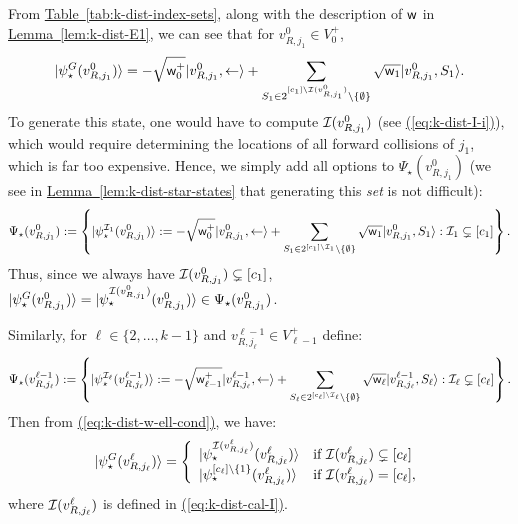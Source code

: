 \documentclass{theoretics}
\newcommand{\eq}[1]{\hyperref[eq:#1]{(\ref*{eq:#1})}}
\newcommand{\lem}[1]{\hyperref[lem:#1]{Lemma~\ref*{lem:#1}}}
\newcommand{\tabl}[1]{\hyperref[tab:#1]{Table~\ref*{tab:#1}}}
\def\ket#1{{\lvert}#1\rangle}
\renewcommand{\>}{\rangle}
\newcommand{\<}{\langle}
\renewcommand{\(}{\left(}
\renewcommand{\)}{\right)}
\def\w{{\sf w}}
\begin{document}
\noindent From \tabl{k-dist-index-sets}, along with the description of $\w$ in \lem{k-dist-E1}, we can see that for $v^0_{R,j_1}\in V_0^+$, 
\begin{equation*}
\ket{\psi_\star^{G}(v^0_{R,j_1})} = -\sqrt{\w_0^+}\ket{v_{R,j_1}^0,\leftarrow}+\sum_{S_1\in 2^{[c_1]\setminus{\cal I}(v_{R,j_1}^0)}\setminus\{\emptyset\}}\sqrt{\w_1}\ket{v_{R,j_1}^0,S_1}.
\end{equation*}
To generate this state, one would have to compute ${\cal I}(v^{0}_{R,j_1})$ (see \eq{k-dist-I-i}), which would require determining the locations of all forward collisions of $j_1$, which is far too expensive. Hence, we simply add all options to $\Psi_\star(v^{0}_{R,j_1})$ (we see in \lem{k-dist-star-states} that generating this \emph{set} is not difficult):
\begin{equation}
	\Psi_\star(v^0_{R,j_1}) := \left\{\ket{\psi_\star^{{\cal I}_1}(v^0_{R,j_1})}:=-\sqrt{\w_0^+}\ket{v^0_{R,j_1},\leftarrow}+ \sum_{S_{1}\in 2^{[c_{1}] \setminus {\cal I}_{1}}\setminus\{\emptyset\}} \sqrt{\w_{1}}\ket{v^0_{R,j_1},S_1} : {\cal I}_{1}\subsetneq[c_{1}]\right\}.\label{eq:k-Psi-v-0-plus}
\end{equation}
Thus, since we always have ${\cal I}(v^0_{R,j_1})\subsetneq[c_1]$, $\ket{\psi_\star^G(v^0_{R,j_1})}=\ket{\psi_\star^{{\cal I}(v^0_{R,j_1})}(v^0_{R,j_1})}\in \Psi_{\star}(v^0_{R,j_1})$. 

Similarly, for $\ell\in \{2,\dots,k-1\}$ and $v^{\ell-1}_{R,j_{\ell}}\in V_{\ell-1}^+$ define:
\begin{equation}
	\Psi_\star(v^{\ell-1}_{R,j_{\ell}}) := \left\{\ket{\psi_\star^{{\cal I}_{\ell}}(v^{\ell-1}_{R,j_{\ell}})}:=-\sqrt{\w_{\ell-1}^+}\ket{v^{\ell-1}_{R,j_{\ell}},\leftarrow}+ \sum_{S_{\ell}\in 2^{[c_{\ell}] \setminus {\cal I}_{\ell}}\setminus\{\emptyset\}} \sqrt{\w_{\ell}}\ket{v^{\ell-1}_{R,j_{\ell}},S_{\ell}} : {\cal I}_{\ell}\subsetneq[c_{\ell}]\right\}.\label{eq:k-Psi-v-ell-plus}
\end{equation}
Then from \eq{k-dist-w-ell-cond},  we have:
\begin{equation}
\ket{\psi_\star^G(v^{\ell}_{R,j_{\ell}})}=\left\{\begin{array}{ll}
\ket{\psi_\star^{{\cal I}(v^{\ell}_{R,j_{\ell}})}(v^{\ell}_{R,j_{\ell}})} & \mbox{if }{\cal I}(v^{\ell}_{R,j_{\ell}})\subsetneq[c_{\ell}]\\
\ket{\psi_\star^{[c_{\ell}]\setminus\{1\}}(v^{\ell}_{R,j_{\ell}})} & \mbox{if }{\cal I}(v^{\ell}_{R,j_{\ell}})=[c_{\ell}], 
\end{array}\right.
\label{k-star-v-ell-plus}
\end{equation}
where ${\cal I}(v^{\ell}_{R,j_{\ell}})$ is defined in \eq{k-dist-cal-I}.
\end{document}
